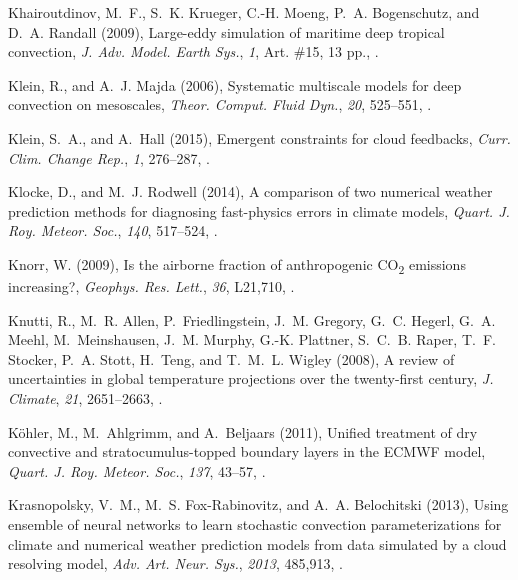 \documentclass[draft]{agujournal}
\begin{document}
\begin{thebibliography}{196}
Khairoutdinov, M.~F., S.~K. Krueger, C.-H. Moeng, P.~A. Bogenschutz, and D.~A.
  Randall (2009), Large-eddy simulation of maritime deep tropical convection,
  \textit{J. Adv. Model. Earth Sys.}, \textit{1}, Art. \#15, 13 pp.,
  .

Klein, R., and A.~J. Majda (2006), Systematic multiscale models for deep
  convection on mesoscales, \textit{Theor. Comput. Fluid Dyn.}, \textit{20},
  525--551, .

Klein, S.~A., and A.~Hall (2015), Emergent constraints for cloud feedbacks,
  \textit{Curr. Clim. Change Rep.}, \textit{1}, 276--287,
  .

Klocke, D., and M.~J. Rodwell (2014), A comparison of two numerical weather
  prediction methods for diagnosing fast-physics errors in climate models,
  \textit{Quart. J. Roy. Meteor. Soc.}, \textit{140}, 517--524,
  .

Knorr, W. (2009), Is the airborne fraction of anthropogenic
  {CO\textsubscript{2}} emissions increasing?, \textit{Geophys. Res. Lett.},
  \textit{36}, L21,710, .

Knutti, R., M.~R. Allen, P.~Friedlingstein, J.~M. Gregory, G.~C. Hegerl, G.~A.
  Meehl, M.~Meinshausen, J.~M. Murphy, G.-K. Plattner, S.~C.~B. Raper, T.~F.
  Stocker, P.~A. Stott, H.~Teng, and T.~M.~L. Wigley (2008), A review of
  uncertainties in global temperature projections over the twenty-first
  century, \textit{J. Climate}, \textit{21}, 2651--2663,
  .

K{\"o}hler, M., M.~Ahlgrimm, and A.~Beljaars (2011), Unified treatment of dry
  convective and stratocumulus-topped boundary layers in the {ECMWF} model,
  \textit{Quart. J. Roy. Meteor. Soc.}, \textit{137}, 43--57,
  .

Krasnopolsky, V.~M., M.~S. Fox-Rabinovitz, and A.~A. Belochitski (2013), Using
  ensemble of neural networks to learn stochastic convection parameterizations
  for climate and numerical weather prediction models from data simulated by a
  cloud resolving model, \textit{Adv. Art. Neur. Sys.}, \textit{2013}, 485,913,
  .


\end{thebibliography}
\end{document}
